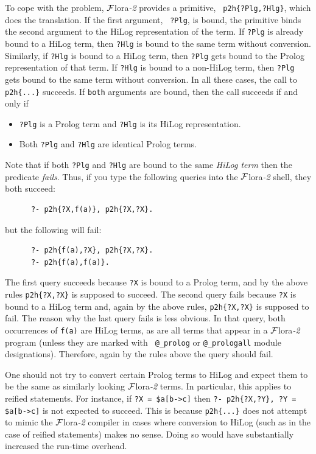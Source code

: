 \documentclass[11pt]{article}
\newcommand{\FLORA}{{\mbox{\sc ${\cal F}${lora}\rm\emph{-2}}}\xspace}
\begin{document}
To cope with the problem, \FLORA provides a primitive, {\tt
  p2h\{?Plg,?Hlg\}}, which does the translation. If the first argument, {\tt
  ?Plg}, is bound, the primitive binds the second argument to the HiLog
representation of the term. If {\tt ?Plg} is already bound to a HiLog term,
then {\tt ?Hlg} is bound to the same term without conversion.  Similarly, if
{\tt ?Hlg} is bound to a HiLog term, then {\tt ?Plg} gets bound to the Prolog
representation of that term. If {\tt ?Hlg} is bound to a non-HiLog term,
then {\tt ?Plg} gets bound to the same term without conversion. In all these
cases, the call to {\tt p2h\{...\}} succeeds. If {\tt both} arguments are
bound, then the call succeeds if and only if
\begin{itemize}
\item {\tt ?Plg} is a Prolog term and {\tt ?Hlg} is its HiLog
  representation.
\item Both {\tt ?Plg} and {\tt ?Hlg} are identical Prolog terms.
\end{itemize}
Note that if both {\tt ?Plg} and {\tt ?Hlg} are bound to the same
\emph{HiLog term} then the predicate \emph{fails}. Thus, if you type the
following queries into the \FLORA shell, they both succeed:
\begin{verbatim}
      ?- p2h{?X,f(a)}, p2h{?X,?X}.
\end{verbatim}
but the following will fail:
\begin{verbatim}
      ?- p2h{f(a),?X}, p2h{?X,?X}.
      ?- p2h{f(a),f(a)}.
\end{verbatim}
The first query succeeds because {\tt ?X}  is bound to a Prolog term, and by the
above rules {\tt p2h\{?X,?X\}} is supposed to succeed. The second query fails
because {\tt ?X} is bound to a HiLog term and, again by the above rules,
{\tt p2h\{?X,?X\}} is supposed to fail.
The reason why the last query fails is less obvious.
In that query, both occurrences of {\tt f(a)} are HiLog terms, as are all
terms that appear in a \FLORA program (unless they are marked with {\tt
  @\_prolog} or {\tt @\_prologall} module designations). Therefore, again by
the rules above the query should fail.

One should not try to convert certain Prolog terms to
HiLog and expect them to be the same as similarly looking \FLORA terms. In
particular, this applies to reified statements. For instance, if {\tt ?X =
\${a[b->c]}} then {\tt ?- p2h\{?X,?Y\}, ?Y = \${a[b->c]}} is not expected to
succeed. This is because {\tt p2h\{...\}} does not attempt to mimic the \FLORA
compiler in cases where conversion to HiLog (such as in the case of reified
statements) makes no sense. Doing so would have substantially increased the
run-time overhead.
\end{document}
